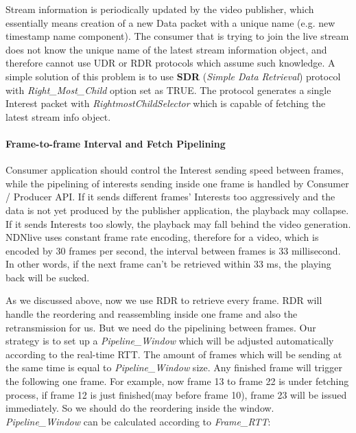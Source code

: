 \begin{enumerate}
Stream information is periodically updated by the video publisher, which essentially means creation of a new Data packet with a unique name (e.g. new timestamp name component). The consumer that is trying to join the live stream does not know the unique name of the latest stream information object, and therefore cannot use UDR or RDR protocols which assume such knowledge. A simple solution of this problem is to use  \textbf{SDR} (\textit{Simple Data Retrieval}) protocol with \textit{Right\_Most\_Child} option set as TRUE. The protocol generates a single Interest packet with \textit{RightmostChildSelector} which is capable of fetching the latest stream info object. 

\end{enumerate}
\vspace{-0.5cm}

\paragraph{Frame-to-frame Interval and Fetch Pipelining}
\vspace{0.1cm}
\label{par:consume_interval_pipelining}
Consumer application should control the Interest sending speed between frames, while the pipelining of interests sending inside one frame is handled by Consumer / Producer API. If it sends different frames' Interests too aggressively and the data is not yet produced by the publisher application, the playback may collapse. If it sends Interests too slowly, the playback may fall behind the video generation. NDNlive uses constant frame rate encoding, therefore for a video, which is encoded by 30 frames per second, the interval between frames is 33 millisecond. In other words, if the next frame can't be retrieved within 33 ms, the playing back will be sucked. 

As we discussed above, now we use RDR to retrieve every frame. RDR will handle the reordering and reassembling inside one frame and also the retransmission for us. But we need do the pipelining between frames. Our strategy is to set up a \textit{Pipeline\_Window} which will be adjusted automatically according to the real-time RTT. The amount of frames which will be sending at the same time is equal to \textit{Pipeline\_Window} size. Any finished frame will trigger the following one frame. For example, now frame 13 to frame 22 is under fetching process, if frame 12 is just finished(may before frame 10), frame 23 will be issued immediately. So we should do the reordering inside the window.  \textit{Pipeline\_Window} can be calculated according to \textit{Frame\_RTT}: 

